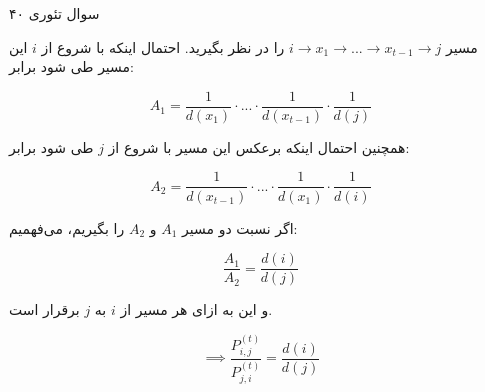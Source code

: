 سوال تئوری ۴۰


مسیر
$i \to x_{1} \to ... \to x_{t - 1} \to j$
را در نظر بگیرید. احتمال اینکه با شروع از $i$ این مسیر طی شود برابر:

$$A_1 = \frac{1}{d(x_{1})} \cdot ... \cdot \frac{1}{d(x_{t - 1})} \cdot \frac{1}{d(j)}$$


همچنین احتمال اینکه برعکس این مسیر با شروع از $j$ طی شود برابر:

$$A_2 = \frac{1}{d(x_{t - 1})} \cdot ... \cdot \frac{1}{d(x_{1})} \cdot \frac{1}{d(i)}$$

اگر نسبت دو مسیر $A_1$ و $A_2$ را بگیریم، می‌فهمیم:

$$ \frac{A_1}{A_2} = \frac{d(i)}{d(j)}$$

و این به ازای هر مسیر از $i$ به $j$ برقرار است.

$$ \implies \frac{P_{i,j}^{(t)}}{P_{j,i}^{(t)}} = \frac{d(i)}{d(j)}$$

